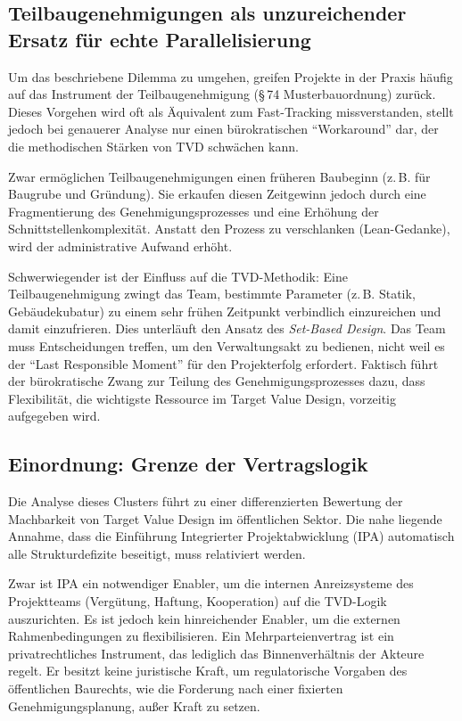 \subsection{Teilbaugenehmigungen als unzureichender Ersatz für echte Parallelisierung}
\label{sec:5.3.3}

Um das beschriebene Dilemma zu umgehen, greifen Projekte in der Praxis häufig auf das Instrument der Teilbaugenehmigung (§\,74 Musterbauordnung) zurück. Dieses Vorgehen wird oft als Äquivalent zum Fast-Tracking missverstanden, stellt jedoch bei genauerer Analyse nur einen bürokratischen \enquote{Workaround} dar, der die methodischen Stärken von \acs{TVD} schwächen kann.

Zwar ermöglichen Teilbaugenehmigungen einen früheren Baubeginn (z.\,B. für Baugrube und Gründung). Sie erkaufen diesen Zeitgewinn jedoch durch eine Fragmentierung des Genehmigungsprozesses und eine Erhöhung der Schnittstellenkomplexität. Anstatt den Prozess zu verschlanken (Lean-Gedanke), wird der administrative Aufwand erhöht.

Schwerwiegender ist der Einfluss auf die \acs{TVD}-Methodik: Eine Teilbaugenehmigung zwingt das Team, bestimmte Parameter (z.\,B. Statik, Gebäudekubatur) zu einem sehr frühen Zeitpunkt verbindlich einzureichen und damit einzufrieren. Dies unterläuft den Ansatz des \textit{Set-Based Design}.\autocite[Vgl.][S.~145]{ballard_target_2025}
 Das Team muss Entscheidungen treffen, um den Verwaltungsakt zu bedienen, nicht weil es der \enquote{Last Responsible Moment} für den Projekterfolg erfordert. Faktisch führt der bürokratische Zwang zur Teilung des Genehmigungsprozesses dazu, dass Flexibilität, die wichtigste Ressource im Target Value Design, vorzeitig aufgegeben wird.


\subsection{Einordnung: Grenze der Vertragslogik}
\label{sec:5.3.4}

Die Analyse dieses Clusters führt zu einer differenzierten Bewertung der Machbarkeit von Target Value Design im öffentlichen Sektor. Die nahe liegende Annahme, dass die Einführung Integrierter Projektabwicklung (\acs{IPA}) automatisch alle Strukturdefizite beseitigt, muss relativiert werden.

Zwar ist \acs{IPA} ein notwendiger Enabler, um die internen Anreizsysteme des Projektteams (Vergütung, Haftung, Kooperation) auf die \acs{TVD}-Logik auszurichten. Es ist jedoch kein hinreichender Enabler, um die externen Rahmenbedingungen zu flexibilisieren. Ein Mehrparteienvertrag ist ein privatrechtliches Instrument, das lediglich das Binnenverhältnis der Akteure regelt. Er besitzt keine juristische Kraft, um regulatorische Vorgaben des öffentlichen Baurechts, wie die Forderung nach einer fixierten Genehmigungsplanung, außer Kraft zu setzen.

